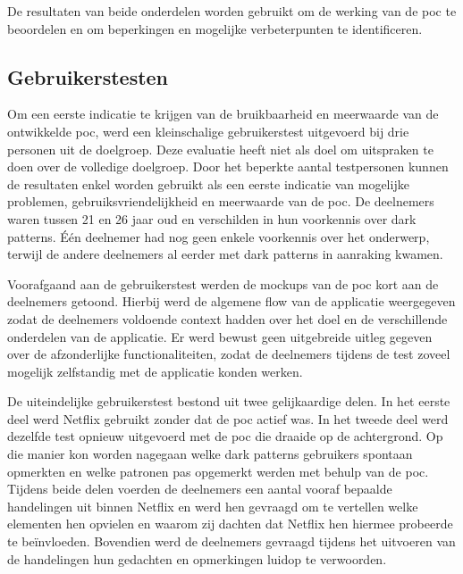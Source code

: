 \vspace{1em}

De resultaten van beide onderdelen worden gebruikt om de werking van de \acrshort{poc} te beoordelen en om beperkingen en mogelijke verbeterpunten te identificeren.

\vspace{1em}

\subsection{Gebruikerstesten}
\label{subsec:gebruikerstesten-evaluatie}

\vspace{1em}

Om een eerste indicatie te krijgen van de bruikbaarheid en meerwaarde van de ontwikkelde \acrshort{poc}, werd een kleinschalige gebruikerstest uitgevoerd bij drie personen uit de doelgroep. Deze evaluatie heeft niet als doel om uitspraken te doen over de volledige doelgroep. Door het beperkte aantal testpersonen kunnen de resultaten enkel worden gebruikt als een eerste indicatie van mogelijke problemen, gebruiksvriendelijkheid en meerwaarde van de \acrshort{poc}. De deelnemers waren tussen 21 en 26 jaar oud en verschilden in hun voorkennis over dark patterns. Één deelnemer had nog geen enkele voorkennis over het onderwerp, terwijl de andere deelnemers al eerder met dark patterns in aanraking kwamen. 

\vspace{1em}

Voorafgaand aan de gebruikerstest werden de mockups van de \acrshort{poc} kort aan de deelnemers getoond. Hierbij werd de algemene flow van de applicatie weergegeven zodat de deelnemers voldoende context hadden over het doel en de verschillende onderdelen van de applicatie. Er werd bewust geen uitgebreide uitleg gegeven over de afzonderlijke functionaliteiten, zodat de deelnemers tijdens de test zoveel mogelijk zelfstandig met de applicatie konden werken.

\vspace{1em}

De uiteindelijke gebruikerstest bestond uit twee gelijkaardige delen. In het eerste deel werd Netflix gebruikt zonder dat de \acrshort{poc} actief was. In het tweede deel werd dezelfde test opnieuw uitgevoerd met de \acrshort{poc} die draaide op de achtergrond. Op die manier kon worden nagegaan welke dark patterns gebruikers spontaan opmerkten en welke patronen pas opgemerkt werden met behulp van de \acrshort{poc}. Tijdens beide delen voerden de deelnemers een aantal vooraf bepaalde handelingen uit binnen Netflix en werd hen gevraagd om te vertellen welke elementen hen opvielen en waarom zij dachten dat Netflix hen hiermee probeerde te beïnvloeden. Bovendien werd de deelnemers gevraagd tijdens het uitvoeren van de handelingen hun gedachten en opmerkingen luidop te verwoorden.

